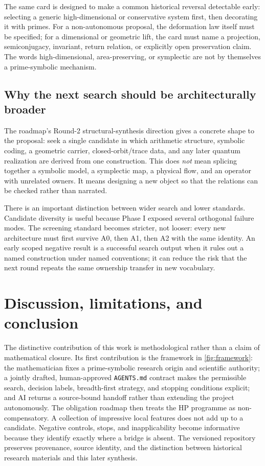 The same card is designed to make a common historical reversal detectable
early: selecting a generic high-dimensional or conservative system first, then
decorating it with primes.
For a non-autonomous proposal, the deformation law itself must be specified;
for a dimensional or geometric lift, the card must name a projection,
semiconjugacy, invariant, return relation, or explicitly open preservation
claim. The words high-dimensional, area-preserving, or symplectic are not by
themselves a prime-symbolic mechanism.

\subsection{Why the next search should be architecturally broader}

The roadmap's Round-2 structural-synthesis direction gives a concrete shape to
the proposal: seek a single candidate in which arithmetic structure, symbolic
coding, a geometric carrier, closed-orbit/trace data, and any later quantum
realization are derived from one construction. This does \emph{not} mean
splicing together a symbolic model, a symplectic map, a physical flow, and an
operator with unrelated owners. It means designing a new object so that the
relations can be checked rather than narrated.

There is an important distinction between wider search and lower standards.
Candidate diversity is useful because Phase I exposed several orthogonal
failure modes. The screening standard becomes stricter, not looser: every new
architecture must first survive A0, then A1, then A2 with the same identity.
An early scoped negative result is a successful search output when it rules out
a named construction under named conventions; it can reduce the risk that the
next round repeats the same ownership transfer in new vocabulary.

\section{Discussion, limitations, and conclusion}
\label{sec:discussion}

The distinctive contribution of this work is methodological rather than a
claim of mathematical closure. Its first contribution is the framework in
\cref{fig:framework}: the mathematician fixes a prime-symbolic research origin
and scientific authority; a jointly drafted, human-approved \texttt{AGENTS.md}
contract makes the permissible search, decision labels, breadth-first strategy,
and stopping conditions explicit; and AI returns a source-bound handoff rather
than extending the project autonomously. The obligation roadmap then treats the
HP programme as non-compensatory. A collection of impressive local features does
not add up to a candidate. Negative controls, stops, and inapplicability become
informative because they identify exactly where a bridge is absent. The
versioned repository preserves provenance, source identity, and the distinction
between historical research materials and this later synthesis.

